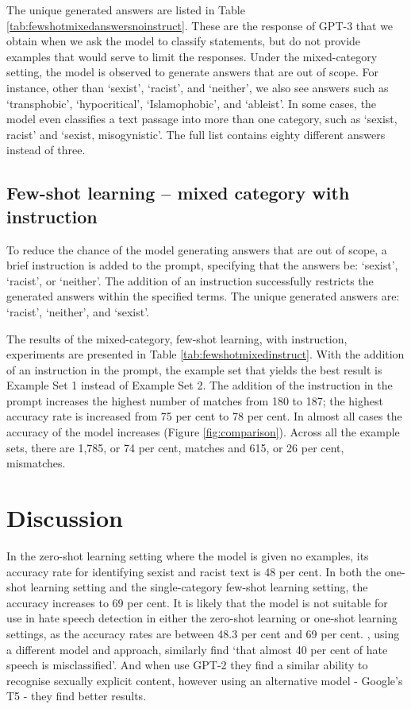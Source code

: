 \documentclass{bmcart}
\begin{document}
The unique generated answers are listed in Table \ref{tab:fewshotmixedanswersnoinstruct}. These are the response of GPT-3 that we obtain when we ask the model to classify statements, but do not provide examples that would serve to limit the responses. Under the mixed-category setting, the model is observed to generate answers that are out of scope. For instance, other than `sexist', `racist', and `neither', we also see answers such as `transphobic', `hypocritical', `Islamophobic', and `ableist'. In some cases, the model even classifies a text passage into more than one category, such as `sexist, racist' and `sexist, misogynistic'. The full list contains eighty different answers instead of three.

\subsection{Few-shot learning -- mixed category with instruction}\label{few-shot-learning-mixed-category-with-instruction}

To reduce the chance of the model generating answers that are out of scope, a brief instruction is added to the prompt, specifying that the answers be: `sexist', `racist', or `neither'. The addition of an instruction successfully restricts the generated answers within the specified terms. The unique generated answers are: `racist', `neither', and `sexist'.

The results of the mixed-category, few-shot learning, with instruction, experiments are presented in Table \ref{tab:fewshotmixedinstruct}. With the addition of an instruction in the prompt, the example set that yields the best result is Example Set 1 instead of Example Set 2. The addition of the instruction in the prompt increases the highest number of matches from 180 to 187; the highest accuracy rate is increased from 75 per cent to 78 per cent. In almost all cases the accuracy of the model increases (Figure \ref{fig:comparison}). Across all the example sets, there are 1,785, or 74 per cent, matches and 615, or 26 per cent, mismatches.


\section{Discussion}\label{discussion}

In the zero-shot learning setting where the model is given no examples, its accuracy rate for identifying sexist and racist text is 48 per cent. In both the one-shot learning setting and the single-category few-shot learning setting, the accuracy increases to 69 per cent. It is likely that the model is not suitable for use in hate speech detection in either the zero-shot learning or one-shot learning settings, as the accuracy rates are between 48.3 per cent and 69 per cent. \cite{davidson2017automated}, using a different model and approach, similarly find `that almost 40 per cent of hate speech is misclassified'. And when \cite{schick2021selfdiagnosis} use GPT-2 they find a similar ability to recognise sexually explicit content, however using an alternative model - Google's T5 \cite{raffel2020exploring} - they find better results.
\end{document}
